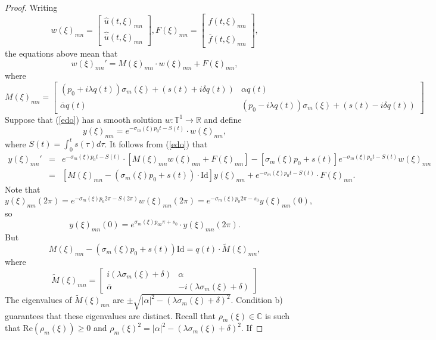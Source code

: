 \documentclass[sn-mathphys-num]{sn-jnl}%
\numberwithin{equation}{section}
\theoremstyle{thmstyleone}
\theoremstyle{thmstyletwo}
\theoremstyle{thmstylethree}
\renewcommand{\Re}{\textrm{Re}}
\begin{document}
\begin{proof}
Writing
$$w(\xi)_{mn}=\left[ \begin{array}{c} \widehat{u}(t,\xi)_{mn} \\ \widehat{\overline{u}}(t,\xi)_{mn} \end{array} \right], F(\xi)_{mn} =  \left[ \begin{array}{c} \widehat{f}(t,\xi)_{mn} \\ \widehat{\overline{f}}(t,\xi)_{mn} \end{array} \right],$$
the equations above mean that
\begin{equation}\label{edo} w(\xi)_{mn}' = M(\xi)_{mn} \cdot w(\xi)_{mn}+F(\xi)_{mn},
\end{equation}
where
$$M(\xi)_{mn}= \left[ \begin{array}{cc} (p_0+i\lambda q(t))\sigma_m(\xi)+(s(t)+i\delta q(t)) & \alpha q(t) \\ \overline{\alpha} q(t) & (p_0-i\lambda q(t))\sigma_m(\xi)+(s(t)-i\delta q(t)) \end{array}  \right] $$
Suppose that (\ref{edo}) has a smooth solution $w:\mathbb{T}^1 \rightarrow \mathbb{R}$ and define
$$y(\xi)_{mn}=e^{-\sigma_m(\xi)p_0 t-S(t)}\cdot w(\xi)_{mn},$$
where $S(t)=\int_0^t s(\tau)d\tau$. It follows from (\ref{edo}) that 
\begin{eqnarray*} y(\xi)_{mn}' & = & e^{-\sigma_m(\xi)p_0 t-S(t)} \cdot \left[M(\xi)_{mn}w(\xi)_{mn}+F(\xi)_{mn}\right] -\left[\sigma_m(\xi)p_0+s(t) \right]e^{-\sigma_m(\xi)p_0 t-S(t)}w(\xi)_{mn} \\
	& = & \left[ M(\xi)_{mn}-(\sigma_m(\xi)p_0+s(t))\cdot \textrm{Id}\right]y(\xi)_{mn}+e^{-\sigma_m(\xi)p_0 t-S(t)}\cdot F(\xi)_{mn}.
\end{eqnarray*}   
Note that
$$y(\xi)_{mn}(2\pi)=e^{-\sigma_m(\xi)p_0 2\pi -S(2\pi)}w(\xi)_{mn}(2\pi)=e^{-\sigma_m(\xi)p_0 2\pi-s_0}y(\xi)_{mn}(0),$$
so
$$y(\xi)_{mn}(0)=e^{\sigma_m(\xi)p_02\pi +s_0}\cdot y(\xi)_{mn}(2\pi).$$
But
$$M(\xi)_{mn}-(\sigma_m(\xi)p_0+s(t))\textrm{Id} =q(t) \cdot \widetilde{M}(\xi)_{mn},$$
where
$$\widetilde{M}(\xi)_{mn} = \left[ \begin{array}{cc} i(\lambda \sigma_m(\xi)+\delta) & \alpha \\ \overline{\alpha} & -i(\lambda \sigma_m(\xi)+\delta) \end{array}  \right] $$
The eigenvalues of $\widetilde{M}(\xi)_{mn}$ are $\pm \sqrt{|\alpha|^2-(\lambda \sigma_m(\xi)+\delta)^2}$. Condition b) guarantees that these eigenvalues are distinct. Recall that $\rho_m(\xi) \in \mathbb{C}$ is such that $\Re(\rho_m(\xi))\geq 0$ and $\rho_m(\xi)^2=|\alpha|^2-(\lambda \sigma_m(\xi)+\delta)^2$. If

\end{proof}
\end{document}
